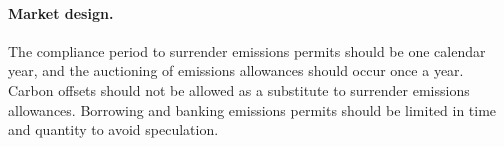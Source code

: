 \documentclass[12pt,english]{article}
\begin{document}

\paragraph{Market design.} 
The compliance period to surrender emissions permits should be one calendar year, and the auctioning of emissions allowances should occur once a year. Carbon offsets should not be allowed as a substitute to surrender emissions allowances. Borrowing and banking emissions permits should be limited in time and quantity to avoid speculation. %


\end{document}
